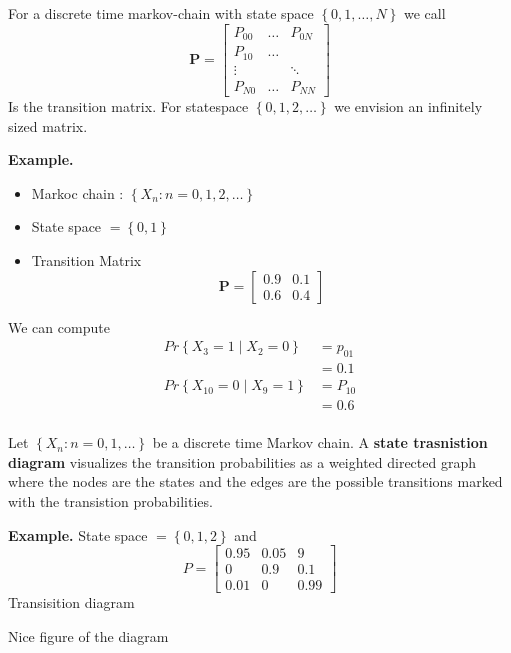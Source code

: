 \documentclass{article}
\theoremstyle{remark}
\begin{document}
\begin{definition} \quad
  For a discrete time markov-chain with state space $\left \{ 0,1, \ldots, N \right \}$ we call
  \[
  \mathbf{P} = \begin{bmatrix} 
    P_{00} & \ldots & P_{0N} \\
    P_{10}  & \ldots \\
    \vdots  &   &  \ddots \\
    P_{N0} & \ldots & P_{NN} 
  \end{bmatrix} 
  \] 
  Is the transition matrix.
  For statespace $\left\{ 0,1,2, \ldots \right\}$ we envision an infinitely sized matrix.
\end{definition}

 \begin{tcolorbox}
   \textbf{Example.} 
   \begin{itemize}
     \item Markoc chain : $\left\{ X_{n} : n = 0,1,2,\ldots \right\}$
     \item State space  $= \left\{ 0,1 \right\}$
     \item Transition Matrix \[
     \mathbf{P} = \begin{bmatrix} 
     0.9  &  0.1 \\
     0.6  &  0.4
     \end{bmatrix} 
     \] 
   \end{itemize}
   We can compute \[
     \begin{split}
        Pr \left \{ X_{3} = 1  \mid  X_{2} = 0 \right \} &=  p_{01} \\
        &= 0.1   \\
        Pr \left \{ X_{10} = 0  \mid  X_{9} = 1 \right \} &=  P_{10} \\
        &= 0.6  \\
     \end{split} 
   \] 
 \end{tcolorbox}

\begin{definition}
  Let $\left\{ X_{n}: n = 0,1, \ldots \right\}$ be a discrete time Markov chain.  A \textbf{state trasnistion diagram} visualizes the transition probabilities as a weighted directed graph where the nodes are the states and the edges are the possible transitions marked with the transistion probabilities.
\end{definition}

\begin{tcolorbox}
  \textbf{Example.} State space $= \left\{ 0,1,2 \right\}$ and \[
  P = \begin{bmatrix} 
  0.95  & 0.05 & 9 \\
  0  & 0.9  &  0.1 \\
  0.01  &  0  &  0.99
  \end{bmatrix} 
  \] 
  Transisition diagram 
  \begin{tcolorbox}
    Nice figure of the diagram
  \end{tcolorbox}
\end{tcolorbox}
\end{document}
